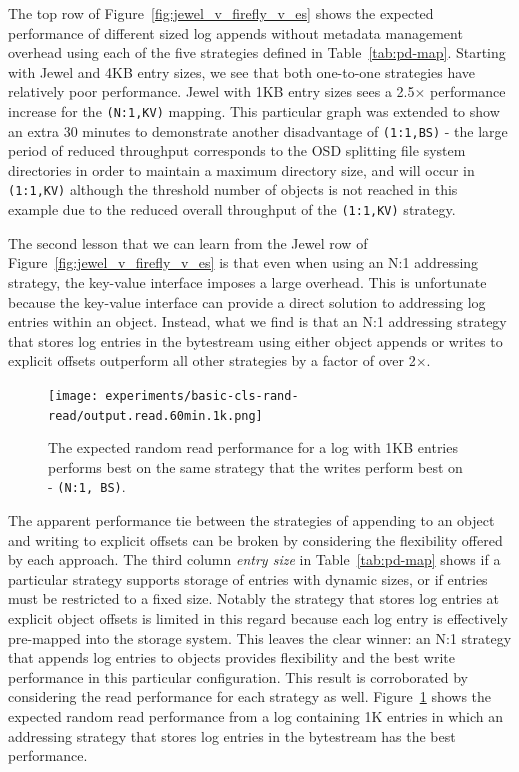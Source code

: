 \documentclass[10pt,twocolumn]{article}
\begin{document}
The top row of Figure~\ref{fig:jewel_v_firefly_v_es} shows the expected
performance of different sized log appends without metadata management overhead
using each of the five strategies defined in Table~\ref{tab:pd-map}.  Starting
with Jewel and 4KB entry sizes, we see that both one-to-one strategies have
relatively poor performance. Jewel with 1KB entry sizes sees a 2.5\(\times\)
performance increase for the \texttt{(N:1,KV)} mapping. This particular graph
was extended to show an extra 30 minutes to demonstrate another disadvantage of
\texttt{(1:1,BS)} - the large period of reduced throughput corresponds to
the OSD splitting file system directories in order to maintain a maximum
directory size, and will occur in \texttt{(1:1,KV)} although the threshold
number of objects is not reached in this example due to the reduced overall
throughput of the \texttt{(1:1,KV)} strategy.

The second lesson that we can learn from the Jewel row of
Figure~\ref{fig:jewel_v_firefly_v_es} is that even when using an N:1 addressing
strategy, the key-value interface imposes a large overhead. This is unfortunate
because the key-value interface can provide a direct solution to addressing log
entries within an object.  Instead, what we find is that an N:1 addressing
strategy that stores log entries in the bytestream using either object appends
or writes to explicit offsets outperform all other strategies by a factor of
over 2\(\times\).

\begin{figure}[t]
      \centering
      \texttt{[image: experiments/basic-cls-rand-read/output.read.60min.1k.png]}
      \caption{The expected random read performance for a log with 1KB entries
      performs best on the same strategy that the writes perform
      best on - \texttt{(N:1, BS)}.}
      \label{fig:vanilla_rd_jewel}
\end{figure}

The apparent performance tie between the strategies of appending to an object
and writing to explicit offsets can be broken by considering the flexibility
offered by each approach. The third column \emph{entry size} in
Table~\ref{tab:pd-map} shows if a particular strategy supports storage of
entries with dynamic sizes, or if entries must be restricted to a fixed size.
Notably the strategy that stores log entries at explicit object offsets is
limited in this regard because each log entry is effectively pre-mapped into
the storage system. This leaves the clear winner: an N:1 strategy that appends
log entries to objects provides flexibility and the best write performance in
this particular configuration.  This result is corroborated by considering the
read performance for each strategy as well. Figure~\ref{fig:vanilla_rd_jewel}
shows the expected random read performance from a log containing 1K entries in
which an addressing strategy that stores log entries in the bytestream has the
best performance.
\end{document}
